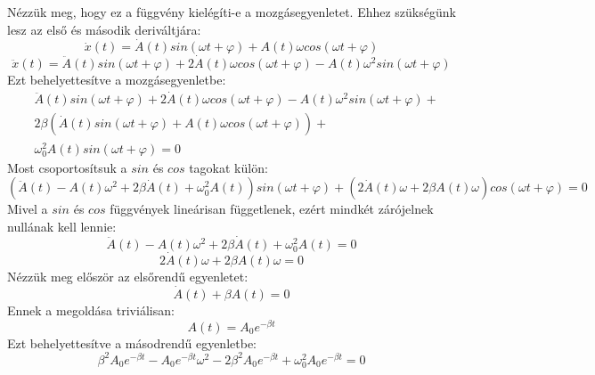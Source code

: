 \documentclass[../main.tex]{subfiles}
\begin{document}
Nézzük meg, hogy ez a függvény kielégíti-e a mozgásegyenletet. Ehhez szükségünk lesz az első és második deriváltjára:
\begin{equation}
    \dot{x}(t) = \dot{A}(t) sin(\omega t + \varphi) + A(t) \omega cos(\omega t + \varphi)
\end{equation}
\begin{equation}
    \ddot{x}(t) = \ddot{A}(t) sin(\omega t + \varphi) + 2\dot{A}(t) \omega cos(\omega t + \varphi) - A(t) \omega^2 sin(\omega t + \varphi)
\end{equation}
Ezt behelyettesítve a mozgásegyenletbe:
\begin{equation}
    \begin{aligned}
        & \ddot{A}(t) sin(\omega t + \varphi) + 2\dot{A}(t) \omega cos(\omega t + \varphi) - A(t) \omega^2 sin(\omega t + \varphi) + \\
        & 2\beta \left( \dot{A}(t) sin(\omega t + \varphi) + A(t) \omega cos(\omega t + \varphi) \right) + \\
        & \omega_0^2 A(t) sin(\omega t + \varphi) = 0
    \end{aligned}
\end{equation}
Most csoportosítsuk a $sin$ és $cos$ tagokat külön:
\begin{equation}
    \left( \ddot{A}(t) - A(t) \omega^2 + 2\beta \dot{A}(t) + \omega_0^2 A(t) \right) sin(\omega t + \varphi) + \left( 2\dot{A}(t) \omega + 2\beta A(t) \omega \right) cos(\omega t + \varphi) = 0
\end{equation}
Mivel a $sin$ és $cos$ függvények lineárisan függetlenek, ezért mindkét zárójelnek nullának kell lennie:
\begin{equation}
    \ddot{A}(t) - A(t) \omega^2 + 2\beta \dot{A}(t) + \omega_0^2 A(t) = 0
\end{equation}
\begin{equation}
    2\dot{A}(t) \omega + 2\beta A(t) \omega = 0
\end{equation}
Nézzük meg először az elsőrendű egyenletet:
\begin{equation}
    \dot{A}(t) + \beta A(t) = 0
\end{equation}
Ennek a megoldása triviálisan:
\begin{equation}
    A(t) = A_0 e^{-\beta t}
\end{equation}
Ezt behelyettesítve a másodrendű egyenletbe:
\begin{equation}
    \beta^2 A_0 e^{-\beta t} - A_0 e^{-\beta t} \omega^2 - 2\beta^2 A_0 e^{-\beta t} + \omega_0^2 A_0 e^{-\beta t} = 0
\end{equation}
\end{document}
